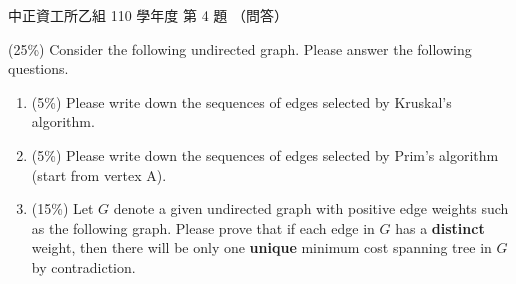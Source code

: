 \begin{pastexam}[label={px:ccu-110-csb-04}]{中正資工所乙組 110 學年度 第 4 題}
（問答）

(25\%) Consider the following undirected graph. Please answer the following questions.
\begin{enumerate}[label=(\alph*)]
\item (5\%) Please write down the sequences of edges selected by Kruskal's algorithm.
\item (5\%) Please write down the sequences of edges selected by Prim's algorithm (start from
vertex A).
\item (15\%) Let $G$ denote a given undirected graph with positive edge weights such as the
following graph. Please prove that if each edge in $G$ has a \textbf{distinct} weight, then there
will be only one \textbf{unique} minimum cost spanning tree in $G$ by contradiction.
\end{enumerate}

\begin{center}
\end{center}
\end{pastexam}

